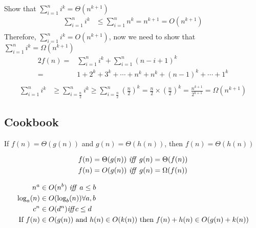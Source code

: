 \begin{example}
    [Summation]
    Show that $\sum_{i=1}^{n} i^k = \Theta(n^{k+1})$
    \begin{align*}
        \sum_{i=1}^{n} i^k & \leq \sum_{i=1}^{n} n^{k} = n^{k+1} = O(n^{k+1})\\
    \end{align*}
    Therefore, $\sum_{i=1}^{n} i^k = O(n^{k+1})$, now we need to show that $\sum_{i=1}^{n} i^k = \Omega(n^{k+1})$
    \begin{align*}
        2f(n) =& \sum_{i=1}^{n}i^k + \sum_{i=1}^{n}(n-i+1)^k  \\
        = & 1 + 2^k + 3^k + \cdots + n^k + n^k + (n-1)^k + \cdots + 1^k\\
    \end{align*}
    \begin{align*}
        \sum_{i=1}^{n} i^k & \geq \sum_{i=\frac{n}{2}}^{n} i^k \geq \sum_{i=\frac{n}{2}}^{n} (\frac{n}{2})^k = \frac{n}{2} \times (\frac{n}{2})^k = \frac{n^{k+1}}{2^{k+1}} = \Omega(n^{k+1})
    \end{align*}
\end{example}

\subsection*{Cookbook}
\begin{definition}
    [Transitivity]
    If $f(n) = \Theta(g(n))$ and $g(n) = \Theta(h(n))$, then $f(n) = \Theta(h(n))$
\end{definition}


\begin{definition}
    [Symmetry]
    \begin{align*}
        f(n) &= \Theta(g(n)) \text{ \textit{iff} } g(n) = \Theta(f(n)) \\
        f(n) &= O(g(n)) \text{ \textit{iff} } g(n) = \Omega(f(n))
    \end{align*}
\end{definition}

\begin{theorem}
    \begin{align*}
        n^a & \in O(n^b) \text{ \textit{iff} } a \leq b\\
        \log_a(n) & \in O(\log_b(n)) \forall a, b \\
        c^n & \in O(d^n) \text{\textit{iff}} c \leq d \\
        \text{If } f(n) & \in O(g(n)) \text{ and } h(n) \in O(k(n)) \text{ then } f(n) + h(n) \in O(g(n) + k(n))\\
    \end{align*}
    
\end{theorem}